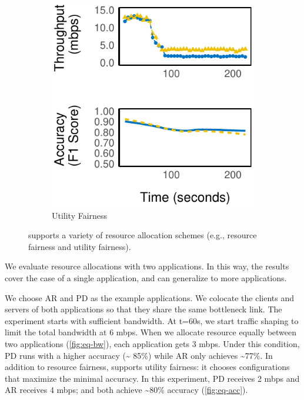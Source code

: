 \begin{figure}
\begin{subfigure}[t]{0.45\columnwidth}
    \includegraphics[width=\textwidth]{figures/multitask-right.pdf}
    \caption{Utility Fairness}
    \label{fig:eq-acc}
  \end{subfigure}
  \caption{\sysname{} supports a variety of resource allocation schemes (e.g., resource fairness and utility fairness).}
  \label{fig:multitask}
\end{figure}

We evaluate resource allocations with two applications. In this way, the results
cover the case of a single application, and can generalize to more applications.

We choose AR and PD as the example applications.  We colocate the clients and
servers of both applications so that they share the same bottleneck link. The
experiment starts with sufficient bandwidth. At t=60s, we start traffic shaping
to limit the total bandwidth at 6 mbps. When we allocate resource equally
between two applications (\autoref{fig:eq-bw}), each application gets 3
mbps. Under this condition, PD runs with a higher accuracy (\textasciitilde
85\%) while AR only achieves \textasciitilde 77\%. In addition to resource
fairness, \sysname{} supports utility fairness: it chooses configurations that
maximize the minimal accuracy. In this experiment, PD receives 2 mbps and AR
receives 4 mbps; and both achieve \textasciitilde 80\% accuracy
(\autoref{fig:eq-acc}).


